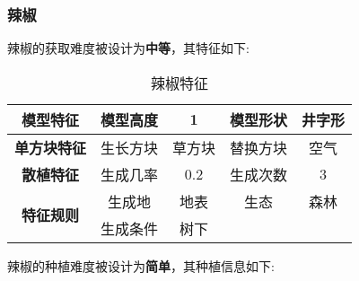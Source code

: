 \subsubsection{辣椒}

辣椒的获取难度被设计为\textbf{中等}，其特征如下:
\begin{table}[H]
    \centering
    \caption{辣椒特征}
    \label{table:辣椒特征}
    \setlength{\tabcolsep}{4mm}
    \begin{tabular}{c|cc|cc}
        \toprule
        \textbf{模型特征}                  & 模型高度 & 1      & 模型形状 & 井字形 \\
        \midrule
        \textbf{单方块特征}                & 生长方块 & 草方块 & 替换方块 & 空气   \\
        \midrule
        \textbf{散植特征}                  & 生成几率 & 0.2    & 生成次数 & 3      \\
        \midrule
        \multirow{2}{*}{\textbf{特征规则}} & 生成地   & 地表   & 生态     & 森林   \\
                                           & 生成条件 & 树下                       \\
        \bottomrule
    \end{tabular}
\end{table}


辣椒的种植难度被设计为\textbf{简单}，其种植信息如下:

